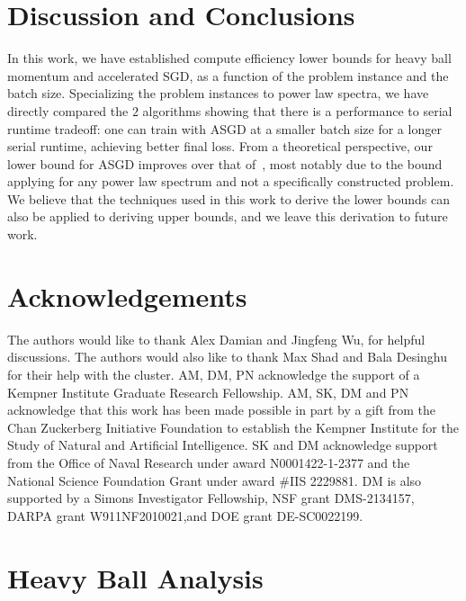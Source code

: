 \documentclass{article}
\begin{document}
\section{Discussion and Conclusions}
In this work, we have established compute efficiency lower bounds for heavy ball momentum and accelerated SGD, as a function of the problem instance and the batch size. Specializing the problem instances to power law spectra, we have directly compared the $2$ algorithms showing that there is a performance to serial runtime tradeoff: one can train with ASGD at a smaller batch size for a longer serial runtime, achieving better final loss. From a theoretical perspective, our lower bound for ASGD improves over that of~\citep{kidambi2018insufficiency}, most notably due to the bound applying for any power law spectrum and not a specifically constructed problem. We believe that the techniques used in this work to derive the lower bounds can also be applied to deriving upper bounds, and we leave this derivation to future work. 

\section*{Acknowledgements}
The authors would like to thank Alex Damian and Jingfeng Wu, for helpful discussions. The authors would also like to thank Max Shad and Bala Desinghu for their help with the cluster. AM, DM, PN acknowledge the support of a Kempner Institute Graduate Research Fellowship. AM, SK, DM and PN
acknowledge that this work has been made possible in part by a gift from the Chan Zuckerberg
Initiative Foundation to establish the Kempner Institute for the Study of Natural and Artificial
Intelligence. SK and DM acknowledge support from the Office of Naval Research under award N0001422-1-2377 and the National Science Foundation Grant under award \#IIS 2229881. DM is also supported by a Simons Investigator Fellowship, NSF grant DMS-2134157, DARPA grant W911NF2010021,and DOE grant DE-SC0022199.




\clearpage
\appendix

\section{Heavy Ball Analysis}
\label{sec:appendix_hb_proofs}
\end{document}
